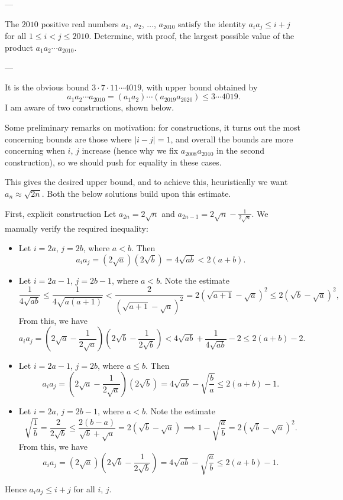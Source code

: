 
---

The $2010$ positive real numbers $a_1$, $a_2$, $\ldots$, $a_{2010}$ satisfy the identity $a_ia_j\le i+j$ for all $1\le i<j\le2010$. Determine, with proof, the largest possible value of the product $a_1a_2\cdots a_{2010}$.

---

It is the obvious bound $3\cdot7\cdot11\cdots4019$, with upper bound obtained by \[a_1a_2\cdots a_{2010}=(a_1a_2)\cdots(a_{2019}a_{2020})\le3\cdots4019.\]
I am aware of two constructions, shown below.
\begin{boxremark}
    Some preliminary remarks on motivation: for constructions, it turns out the most concerning bounds are those where $|i-j|=1$, and overall the bounds are more concerning when $i$, $j$ increase (hence why we fix $a_{2008}a_{2010}$ in the second construction), so we should push for equality in these cases.

    This gives the desired upper bound, and to achieve this, heuristically we want $a_n\approx\sqrt{2n}$. Both the below solutions build upon this estimate.
\end{boxremark}
\begin{customenv}{First, explicit construction}
    Let $a_{2n}=2\sqrt n$ and $a_{2n-1}=2\sqrt n-\frac1{2\sqrt n}$. We manually verify the required inequality:
    \begin{itemize}
        \item Let $i=2a$, $j=2b$, where $a<b$. Then \[a_ia_j=\left(2\sqrt a\right)\left(2\sqrt b\right)=4\sqrt{ab}<2(a+b).\]
        \item Let $i=2a-1$, $j=2b-1$, where $a<b$. Note the estimate
            \[\frac1{4\sqrt{ab}}\le\frac1{4\sqrt{a(a+1)}}<\frac2{\left(\sqrt{a+1}-\sqrt a\right)^2}=2\left(\sqrt{a+1}-\sqrt a\right)^2\le2\left(\sqrt b-\sqrt a\right)^2,\]
            From this, we have \[a_ia_j=\left(2\sqrt a-\frac1{2\sqrt a}\right)\left(2\sqrt b-\frac1{2\sqrt b}\right)<4\sqrt{ab}+\frac1{4\sqrt{ab}}-2\le2(a+b)-2.\]
        \item Let $i=2a-1$, $j=2b$, where $a\le b$. Then \[a_ia_j=\left(2\sqrt a-\frac1{2\sqrt a}\right)\left(2\sqrt b\right)=4\sqrt{ab}-\sqrt{\frac ba}\le2(a+b)-1.\]
        \item Let $i=2a$, $j=2b-1$, where $a<b$. Note the estimate \[\sqrt{\frac1b}=\frac2{2\sqrt b}\le\frac{2(b-a)}{\sqrt b+\sqrt a}=2\left(\sqrt b-\sqrt a\right)\implies 1-\sqrt{\frac ab}=2\left(\sqrt b-\sqrt a\right)^2.\]
            From this, we have \[a_ia_j=\left(2\sqrt a\right)\left(2\sqrt b-\frac1{2\sqrt b}\right)=4\sqrt{ab}-\sqrt{\frac ab}\le2(a+b)-1.\]
    \end{itemize}
    Hence $a_ia_j\le i+j$ for all $i$, $j$.
\end{customenv}
